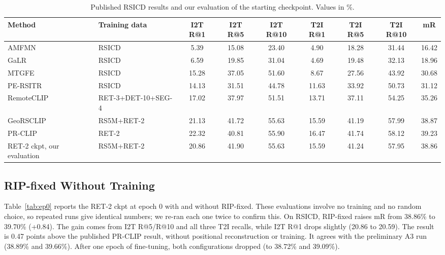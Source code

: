 \documentclass[conference]{IEEEtran}
\begin{document}
\begin{table}[t]
\centering
\caption{Published RSICD results \cite{guan2025prclip} and our evaluation of the starting checkpoint. Values in \%.}
\label{tab:published}
\footnotesize
\begin{tabular}{@{}llccccccc@{}}
\toprule
Method & Training data & I2T R@1 & I2T R@5 & I2T R@10 & T2I R@1 & T2I R@5 & T2I R@10 & mR \\
\midrule
AMFMN \cite{yuan2022amfmn} & RSICD & 5.39 & 15.08 & 23.40 & 4.90 & 18.28 & 31.44 & 16.42 \\
GaLR \cite{yuan2022galr} & RSICD & 6.59 & 19.85 & 31.04 & 4.69 & 19.48 & 32.13 & 18.96 \\
MTGFE \cite{zhang2023mtgfe} & RSICD & 15.28 & 37.05 & 51.60 & 8.67 & 27.56 & 43.92 & 30.68 \\
PE-RSITR \cite{yuan2023pe} & RSICD & 14.13 & 31.51 & 44.78 & 11.63 & 33.92 & 50.73 & 31.12 \\
RemoteCLIP \cite{liu2024remoteclip} & RET-3+DET-10+SEG-4 & 17.02 & 37.97 & 51.51 & 13.71 & 37.11 & 54.25 & 35.26 \\
GeoRSCLIP \cite{zhang2024georsclip} & RS5M+RET-2 & 21.13 & 41.72 & 55.63 & 15.59 & 41.19 & 57.99 & 38.87 \\
PR-CLIP \cite{guan2025prclip} & RET-2 & 22.32 & 40.81 & 55.90 & 16.47 & 41.74 & 58.12 & 39.23 \\
\midrule
RET-2 ckpt, our evaluation & RS5M+RET-2 & 20.86 & 41.90 & 55.63 & 15.59 & 41.24 & 57.95 & 38.86 \\
\bottomrule
\end{tabular}
\end{table}

\subsection{RIP-fixed Without Training}
Table~\ref{tab:ep0} reports the RET-2 ckpt at epoch 0 with and without RIP-fixed. These evaluations involve no training and no random choice, so repeated runs give identical numbers; we re-ran each one twice to confirm this. On RSICD, RIP-fixed raises mR from 38.86\% to 39.70\% (+0.84). The gain comes from I2T R@5/R@10 and all three T2I recalls, while I2T R@1 drops slightly (20.86 to 20.59). The result is 0.47 points above the published PR-CLIP result, without positional reconstruction or training. It agrees with the preliminary A3 run (38.89\% and 39.66\%). After one epoch of fine-tuning, both configurations dropped (to 38.72\% and 39.09\%).
\end{document}
